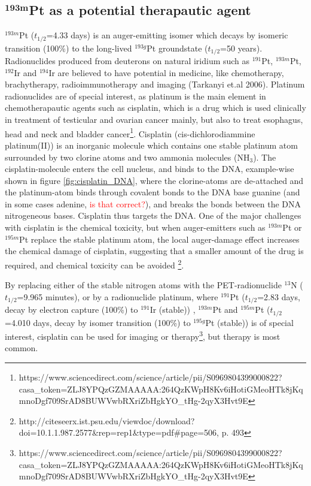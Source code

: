 \subsection{$\mathbf{^{193m}}$Pt as a potential therapautic agent}
$^{193m}$Pt ($t_{1/2}$=4.33 days) is an auger-emitting isomer which decays by isomeric transition (100\%) to the long-lived $^{193g}$Pt groundstate ($t_{1/2}$=50 years). Radionuclides produced from deuterons on natural iridium such as $^{191}$Pt, $^{193m}$Pt, $^{192}$Ir and $^{194}$Ir are believed to have potential in medicine, like chemotherapy, brachytherapy, radioimmunotherapy and imaging (Tarkanyi et.al 2006). Platinum radionuclides are of special interest, as platinum is the main element in chemotherapautic agents such as cisplatin, which is a drug which is used clinically in treatment of testicular and ovarian cancer mainly, but also to treat esophagus, head and neck and bladder cancer\footnote{https://www.sciencedirect.com/science/article/pii/S0969804399000822?casa_token=ZLJ8YPQzGZMAAAAA:264QzKWpH8Kv6iHotiGMeoHTk8jKqmnoDgf709SrAD8BUWVwbRXriZbHgkYO_tHg-2qyX3Hvt9E}. Cisplatin  (cis-dichlorodiammine platinum(II)) is an inorganic molecule which contains one stable platinum atom surrounded by two clorine atoms and two ammonia molecules (NH$_3$). The cisplatin-molecule enters the cell nucleus, and binds to the DNA, example-wise shown in figure \ref{fig:cisplatin_DNA}, where the clorine-atoms are de-attached and the platinum-atom binds through covalent bonds to the DNA base guanine (and in some cases adenine, \textcolor{red}{is that correct?}), and breaks the bonds between the DNA nitrogeneous bases. Cisplatin thus targets the DNA. One of the major challenges with cisplatin is the chemical toxicity, but when auger-emitters such as $^{193m}$Pt or $^{195m}$Pt replace the stable platinum atom, the local auger-damage effect increases the chemical damage of cisplatin, suggesting that a smaller amount of the drug is required, and chemical toxicity can be avoided \footnote{http://citeseerx.ist.psu.edu/viewdoc/download?doi=10.1.1.987.2577&rep=rep1&type=pdf#page=506, p. 493}. 

By replacing either of the stable nitrogen atoms with the PET-radionuclide $^{13}$N ($t_{1/2}$=9.965 minutes), or by a radionuclide platinum, where $^{191}$Pt ($t_{1/2}$=2.83 days, decay by electron capture (100\%) to $^{191}$Ir (stable)) , $^{193m}$Pt and $^{195m}$Pt ($t_{1/2}$=4.010 days, decay by isomer transition (100\%) to $^{195g}$Pt (stable)) is of special interest, cisplatin can be used for imaging or therapy\footnote{https://www.sciencedirect.com/science/article/pii/S0969804399000822?casa_token=ZLJ8YPQzGZMAAAAA:264QzKWpH8Kv6iHotiGMeoHTk8jKqmnoDgf709SrAD8BUWVwbRXriZbHgkYO_tHg-2qyX3Hvt9E}, but therapy is most common. \\ 

